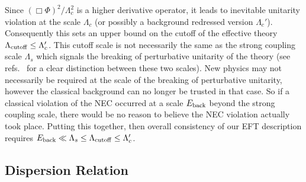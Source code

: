 \documentclass[12pt]{article}
\begin{document}
Since $(\Box \Phi)^2/\Lambda_c^2$ is a higher derivative operator, it leads to inevitable unitarity violation at the scale $\Lambda_c$ (or possibly a background redressed version $\Lambda_c'$). Consequently this sets an upper bound on the cutoff of the effective theory $\Lambda_{\rm cutoff} \le \Lambda_c'$. This cutoff scale is not necessarily the same as the strong coupling scale $\Lambda_s$ which signals the breaking of perturbative unitarity of the theory  (see refs.~\cite{Aydemir:2012nz,deRham:2014wfa} for a clear distinction between these two scales). New physics may not necessarily be required at the scale of the breaking of perturbative unitarity, however the classical background can no longer be trusted in that case. So if a classical violation of the NEC occurred at a scale $E_{\rm back}$ beyond the strong coupling scale, there would be no reason to believe the NEC violation actually took place. Putting this together, then overall consistency of our EFT description requires $E_{\rm back} \ll \Lambda_s \le \Lambda_{\rm cutoff} \le \Lambda_c'$.
\\

\subsection{Dispersion Relation}
\end{document}
